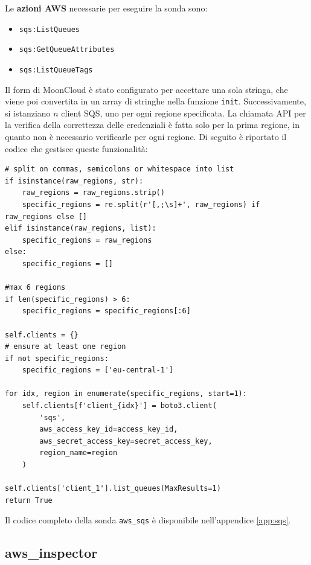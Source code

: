 \noindent Le \textbf{azioni AWS} necessarie per eseguire la sonda sono:

\begin{itemize}
    \item \texttt{sqs:ListQueues}
    \item \texttt{sqs:GetQueueAttributes}
    \item \texttt{sqs:ListQueueTags}
\end{itemize}

Il form di MoonCloud è stato configurato per accettare una sola stringa, che viene poi convertita in un array di stringhe nella funzione \texttt{init}. Successivamente, si istanziano $n$ client SQS, uno per ogni regione specificata. La chiamata API per la verifica della correttezza delle credenziali è fatta solo per la prima regione, in quanto non è necessario verificarle per ogni regione. Di seguito è riportato il codice che gestisce queste funzionalità:

\begin{lstlisting}[style=mypython, caption={Parte della funzione \texttt{init} per la sonda \texttt{aws\_sqs}}]
# split on commas, semicolons or whitespace into list
if isinstance(raw_regions, str):
    raw_regions = raw_regions.strip()
    specific_regions = re.split(r'[,;\s]+', raw_regions) if raw_regions else []
elif isinstance(raw_regions, list):
    specific_regions = raw_regions
else:
    specific_regions = []

#max 6 regions
if len(specific_regions) > 6:
    specific_regions = specific_regions[:6]

self.clients = {}
# ensure at least one region
if not specific_regions:
    specific_regions = ['eu-central-1']

for idx, region in enumerate(specific_regions, start=1):
    self.clients[f'client_{idx}'] = boto3.client(
        'sqs',
        aws_access_key_id=access_key_id,
        aws_secret_access_key=secret_access_key,
        region_name=region
    )

self.clients['client_1'].list_queues(MaxResults=1)
return True
\end{lstlisting}

Il codice completo della sonda \texttt{aws\_sqs} è disponibile nell'appendice \ref{app:sqs}.

\subsection{aws\_inspector}
\label{sec:inspector}

